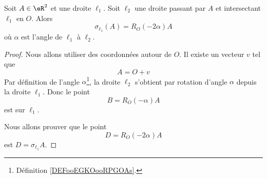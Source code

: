 \begin{lemma}        \label{LEMooJLHGooQIpKIE}
	Soit \( A\in \eR^2\) et une droite \( \ell_1\). Soit \( \ell_2\) une droite passant par \( A\) et intersectant \( \ell_1\) en \( O\). Alors
	\begin{equation}
		\sigma_{\ell_1}(A)=R_O(-2\alpha)A
	\end{equation}
	où \( \alpha\) est l'angle de \( \ell_1\) à \( \ell_2\).
\end{lemma}

\begin{proof}
	Nous allons utiliser des coordonnées autour de \( O\). Il existe un vecteur \( v\) tel que
	\begin{equation}
		A=O+v
	\end{equation}
	Par définition de l'angle \( \alpha\)\footnote{Définition \ref{DEFooEGKOooRPGOAs}.}, la droite \( \ell_2\) s'obtient par rotation d'angle \( \alpha\) depuis la droite \( \ell_1\). Donc le point
	\begin{equation}
		B=R_O(-\alpha)A
	\end{equation}
	est sur \( \ell_1\).

	Nous allons prouver que le point
	\begin{equation}
		D=R_O(-2\alpha)A
	\end{equation}
	est \( D=\sigma_{\ell_1}A\).


\end{proof}
